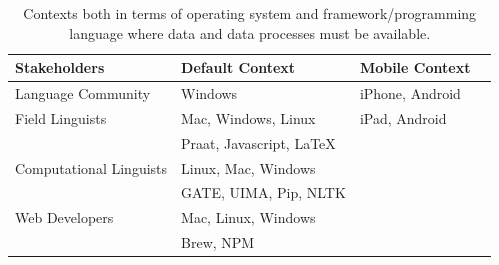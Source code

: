 \documentclass[11pt]{article}
\newcommand{\smalltodo}[2][]
    {\todo[caption={#2}, #1]
    {\tiny#2\normalsize}}
\begin{document}
\begin{table}[h]
\begin{center}
\scriptsize
\begin{tabular}{llll}
      \toprule
      Stakeholders & Default Context & Mobile Context\\\hline\hline
     
      Language Community & Windows &  iPhone, Android\\
      \midrule

	Field Linguists & Mac, Windows, Linux & iPad, Android\\
	  & Praat, Javascript, LaTeX \\
	  \midrule

	Computational Linguists & Linux, Mac, Windows\\
	 & GATE, UIMA, Pip, NLTK\\
	\midrule

	Web Developers & Mac, Linux, Windows\\
	 & Brew, NPM\\

      \bottomrule

\end{tabular}
\caption{Contexts both in terms of operating system and framework/programming language where data and  data processes must be available.}
\label{requirements-contexts}
 \end{center}
 \normalsize
\end{table}





%
\end{document}
